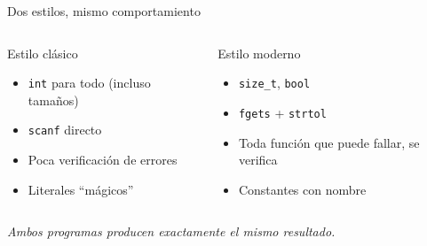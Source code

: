 \documentclass[aspectratio=169]{beamer}
\begin{document}
\begin{frame}{Dos estilos, mismo comportamiento}
    \begin{columns}[T]
        \begin{block}{Estilo clásico}
            \begin{itemize}
                \item \texttt{int} para todo (incluso tamaños)
                \item \texttt{scanf} directo
                \item Poca verificación de errores
                \item Literales ``mágicos''
            \end{itemize}
        \end{block}

        \begin{block}{Estilo moderno}
            \begin{itemize}
                \item \texttt{size\_t}, \texttt{bool}
                \item \texttt{fgets} + \texttt{strtol}
                \item Toda función que puede fallar, se verifica
                \item Constantes con nombre
            \end{itemize}
        \end{block}
    \end{columns}

    \vspace{1em}
    \begin{center}
        \textit{Ambos programas producen exactamente el mismo resultado.}
    \end{center}
\end{frame}
\end{document}
